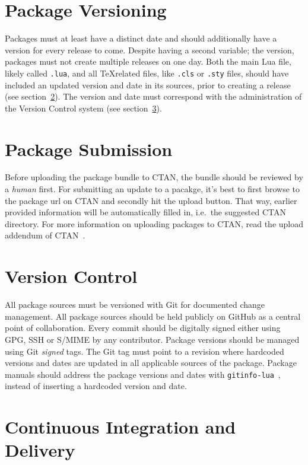 \documentclass{xdpdoc}
\begin{document}
    \section{Package Versioning}

    Packages must at least have a distinct date and should additionally have a version for every release to come.
    Despite having a second variable; the version, packages must not create multiple releases on one day.
    Both the main Lua file, likely called \texttt{.lua}, and all \TeX related files, like \texttt{.cls} or \texttt{.sty} files, should have included an updated version and date in its sources, prior to creating a release (see section~\ref{sec:submission}).
    The version and date must correspond with the administration of the Version Control system (see section~\ref{sec:git}).

    \section{Package Submission}\label{sec:submission}

    Before uploading the package bundle to CTAN, the bundle should be reviewed by a \textit{human} first.
    For submitting an update to a pacakge, it's best to first browse to the package url on CTAN and secondly hit the upload button.
    That way, earlier provided information will be automatically filled in, i.e.\ the suggested CTAN directory.
    For more information on uploading packages to CTAN, read the upload addendum of CTAN~\cite{ctan:help:addendum}.

    \section{Version Control}\label{sec:git}

    All package sources must be versioned with Git for documented change management.
    All package sources should be held publicly on GitHub as a central point of collaboration.
    Every commit should be digitally signed either using GPG, SSH or S/MIME by any contributor.
    Package versions should be managed using Git \textit{signed} tags.
    The Git tag must point to a revision where hardcoded versions and dates are updated in all applicable sources of the package.
    Package manuals should address the package versions and dates with \texttt{gitinfo-lua}~\cite{gitinfo-lua}, instead of inserting a hardcoded version and date.

    \section{Continuous Integration and Delivery}
\end{document}
